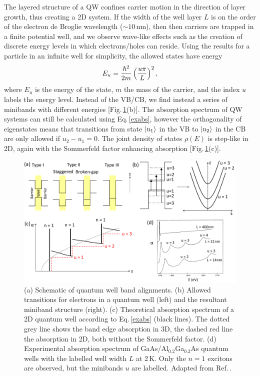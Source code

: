 The layered structure of a QW confines carrier motion in the direction of layer growth, thus creating a 2D system. If the width of the well layer $L$ is on the order of the electron de Broglie wavelength ($\sim10$\,nm), then then carriers are trapped in a finite potential well, and we observe wave-like effects such as the creation of discrete energy levels in which electrons/holes can reside. Using the results for a particle in an infinite well for simplicity, the allowed states have energy
\begin{equation}
\centering
E_u = \frac{\hbar^2}{2m} \left(\frac{u\pi}{L}\right)^2 ,
\label{particleboxenergy}
\end{equation}
where $E_u$ is the energy of the state, $m$ the mass of the carrier, and the index $u$ labels the energy level. Instead of the VB/CB, we find instead a series of minibands with different energies [Fig.\,\ref{2Fig2}(b)]. The absorption spectrum of QW systems can still be calculated using Eq.\,\ref{exabs}, however the orthogonality of eigenstates means that transitions from state $\Ket{u_1}$ in the VB to $\Ket{u_2}$ in the CB are only allowed if $u_2-u_1=0$. The joint density of states $\rho(E)$ is step-like in 2D, again with the Sommerfeld factor enhancing absorption [Fig.\,\ref{2Fig2}(c)].
\begin{figure}[h!] 
\centering    
\includegraphics[width=\textwidth]{Fig2}
\caption{(a) Schematic of quantum well band alignments. (b) Allowed transitions for electrons in a quantum well (left) and the resultant miniband structure (right). (c) Theoretical absorption spectrum of a 2D quantum well according to Eq.\,\ref{exabs} (black lines). The dotted grey line shows the band edge absorption in 3D, the dashed red line the absorption in 2D, both without the Sommerfeld factor. (d) Experimental absorption spectrum of GaAs/Al$_{0.2}$Ga$_{0.2}$As quantum wells with the labelled well width $L$ at 2\,K. Only the $n=1$ excitons are observed, but the minibands $u$ are labelled. Adapted from Ref.\,\cite{Dingle1974}.}
\label{2Fig2}
\end{figure}

